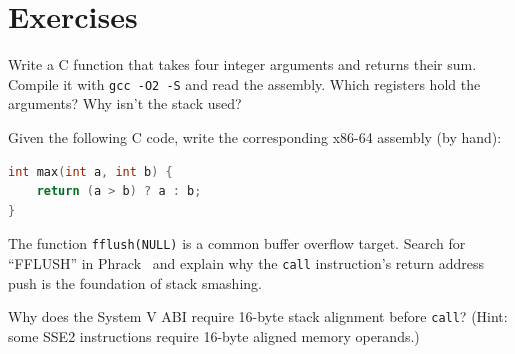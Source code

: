 \section{Exercises}

\begin{exercise}
	Write a C function that takes four integer arguments and returns their sum. Compile it with \texttt{gcc -O2 -S} and read the assembly. Which registers hold the arguments? Why isn't the stack used?
\end{exercise}

\begin{exercise}
	Given the following C code, write the corresponding x86-64 assembly (by hand):
	\begin{lstlisting}[language=C]
int max(int a, int b) {
    return (a > b) ? a : b;
}
	\end{lstlisting}
\end{exercise}

\begin{exercise}
	The function \texttt{fflush(NULL)} is a common buffer overflow target. Search for ``FFLUSH'' in Phrack~\cite{aleph1996smashing} and explain why the \texttt{call} instruction's return address push is the foundation of stack smashing.
\end{exercise}

\begin{exercise}
	Why does the System V ABI require 16-byte stack alignment before \texttt{call}? (Hint: some SSE2 instructions require 16-byte aligned memory operands.)
\end{exercise}
